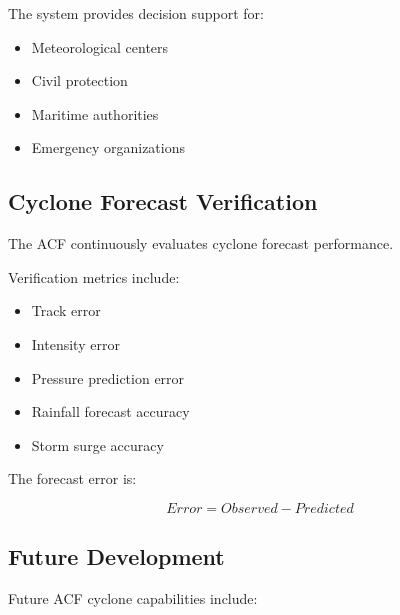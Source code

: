 The system provides decision support for:

\begin{itemize}

\item Meteorological centers

\item Civil protection

\item Maritime authorities

\item Emergency organizations

\end{itemize}



\subsection{Cyclone Forecast Verification}

The ACF continuously evaluates cyclone forecast performance.

Verification metrics include:

\begin{itemize}

\item Track error

\item Intensity error

\item Pressure prediction error

\item Rainfall forecast accuracy

\item Storm surge accuracy

\end{itemize}


The forecast error is:

\[
Error =
Observed -
Predicted
\]



\subsection{Future Development}

Future ACF cyclone capabilities include:

